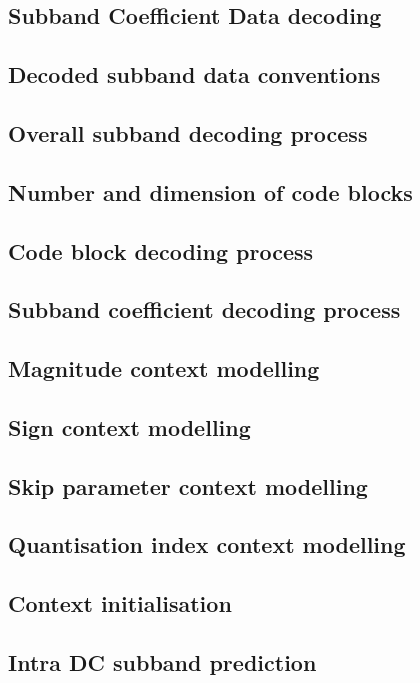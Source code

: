 
\subsection{Subband Coefficient Data decoding}
\subsection{Decoded subband data conventions}
\subsection{Overall subband decoding process}
\subsection{Number and dimension of code blocks}
\subsection{Code block decoding process}
\subsection{Subband coefficient decoding process}
\subsection{Magnitude context modelling}
\subsection{Sign context modelling}
\subsection{Skip parameter context modelling}
\subsection{Quantisation index context modelling}
\subsection{Context initialisation}
\subsection{Intra DC subband prediction}
